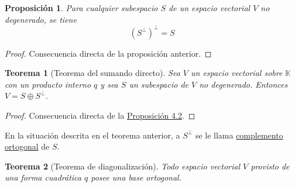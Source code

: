 \documentclass[12pt]{report}
\newtheorem{proposition}{Proposición}[chapter]
\newtheorem{theorem}{Teorema}[chapter]
\theoremstyle{definition}
\theoremstyle{definition}
\theoremstyle{remark}
\begin{document}
\begin{proposition}
Para cualquier subespacio $S$ de un espacio vectorial $V$ no degenerado, se tiene
\[(S^\perp)^\perp = S\]
\end{proposition}

\begin{proof}
Consecuencia directa de la proposición anterior.
\end{proof}

\begin{theorem}[Teorema del sumando directo]
Sea $V$ un espacio vectorial sobre $\mathbb{K}$ con un producto interno $q$ y sea $S$ un subespacio de $V$ no degenerado. Entonces $V = S \oplus S^\perp$.
\end{theorem}

\begin{proof}
Consecuencia directa de la \hyperref[prop4.1.]{\color{blue}Proposición 4.2}.
\end{proof}

En la situación descrita en el teorema anterior, a $S^\perp$ se le llama \ul{complemento ortogonal} de $S$.

\begin{theorem}[Teorema de diagonalización]
\label{teo4.3.}
Todo espacio vectorial $V$ provisto de una forma cuadrática $q$ posee una base ortogonal.
\end{theorem}
\end{document}
